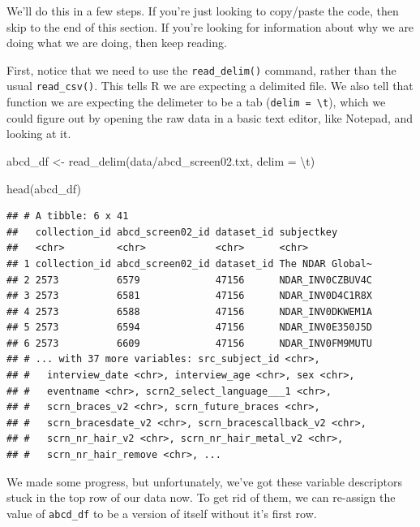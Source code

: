 \documentclass[
]{book}
\newenvironment{Shaded}{\begin{snugshade}}{\end{snugshade}}
\newcommand{\AttributeTok}[1]{\textcolor[rgb]{0.77,0.63,0.00}{#1}}
\newcommand{\FunctionTok}[1]{\textcolor[rgb]{0.00,0.00,0.00}{#1}}
\newcommand{\NormalTok}[1]{#1}
\newcommand{\OtherTok}[1]{\textcolor[rgb]{0.56,0.35,0.01}{#1}}
\newcommand{\SpecialCharTok}[1]{\textcolor[rgb]{0.00,0.00,0.00}{#1}}
\newcommand{\StringTok}[1]{\textcolor[rgb]{0.31,0.60,0.02}{#1}}
\begin{document}
We'll do this in a few steps. If you're just looking to copy/paste the code, then skip to the end of this section. If you're looking for information about why we are doing what we are doing, then keep reading.

First, notice that we need to use the \texttt{read\_delim()} command, rather than the usual \texttt{read\_csv()}. This tells R we are expecting a delimited file. We also tell that function we are expecting the delimeter to be a tab (\texttt{delim\ =\ \textquotesingle{}\textbackslash{}t\textquotesingle{}}), which we could figure out by opening the raw data in a basic text editor, like Notepad, and looking at it.

\begin{Shaded}
\begin{Highlighting}[]
\NormalTok{abcd\_df }\OtherTok{\textless{}{-}} \FunctionTok{read\_delim}\NormalTok{(}\StringTok{\textquotesingle{}data/abcd\_screen02.txt\textquotesingle{}}\NormalTok{, }\AttributeTok{delim =} \StringTok{\textquotesingle{}}\SpecialCharTok{\textbackslash{}t}\StringTok{\textquotesingle{}}\NormalTok{)}

\FunctionTok{head}\NormalTok{(abcd\_df)}
\end{Highlighting}
\end{Shaded}

\begin{verbatim}
## # A tibble: 6 x 41
##   collection_id abcd_screen02_id dataset_id subjectkey      
##   <chr>         <chr>            <chr>      <chr>           
## 1 collection_id abcd_screen02_id dataset_id The NDAR Global~
## 2 2573          6579             47156      NDAR_INV0CZBUV4C
## 3 2573          6581             47156      NDAR_INV0D4C1R8X
## 4 2573          6588             47156      NDAR_INV0DKWEM1A
## 5 2573          6594             47156      NDAR_INV0E350J5D
## 6 2573          6609             47156      NDAR_INV0FM9MUTU
## # ... with 37 more variables: src_subject_id <chr>,
## #   interview_date <chr>, interview_age <chr>, sex <chr>,
## #   eventname <chr>, scrn2_select_language___1 <chr>,
## #   scrn_braces_v2 <chr>, scrn_future_braces <chr>,
## #   scrn_bracesdate_v2 <chr>, scrn_bracescallback_v2 <chr>,
## #   scrn_nr_hair_v2 <chr>, scrn_nr_hair_metal_v2 <chr>,
## #   scrn_nr_hair_remove <chr>, ...
\end{verbatim}

We made some progress, but unfortunately, we've got these variable descriptors stuck in the top row of our data now. To get rid of them, we can re-assign the value of \texttt{abcd\_df} to be a version of itself without it's first row.
\end{document}

